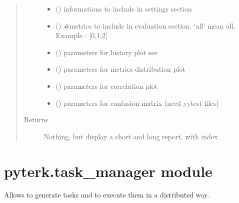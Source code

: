 \documentclass[letterpaper,10pt,english]{sphinxmanual}
\begin{document}
\begin{fulllineitems}
\begin{quote}
\begin{description}
\begin{itemize}
\item {} 
\sphinxAtStartPar
{} () \textendash{} informations to include in settings section

\item {} 
\sphinxAtStartPar
{} () \textendash{} \#metrics to include in evaluation section. ‘all’ mean all. Example : {[}0,1,2{]}

\item {} 
\sphinxAtStartPar
{} () \textendash{} parameters for history plot \sphinxhyphen{} see 

\item {} 
\sphinxAtStartPar
{} () \textendash{} parameters for metrics distribution plot

\item {} 
\sphinxAtStartPar
{} () \textendash{} parameters for correlation plot

\item {} 
\sphinxAtStartPar
{} () \textendash{} parameters for confusion matrix (need yytest files)

\end{itemize}

\item[{Returns}] \leavevmode
\sphinxAtStartPar
Nothing, but display a short and long report, with index.

\end{description}\end{quote}

\end{fulllineitems}



\section{pyterk.task\_manager module}
\label{\detokenize{pyterk:module-pyterk.task_manager}}\label{\detokenize{pyterk:pyterk-task-manager-module}}
\sphinxAtStartPar
Allows to generate tasks and to execute them in a distributed way.
\end{document}
